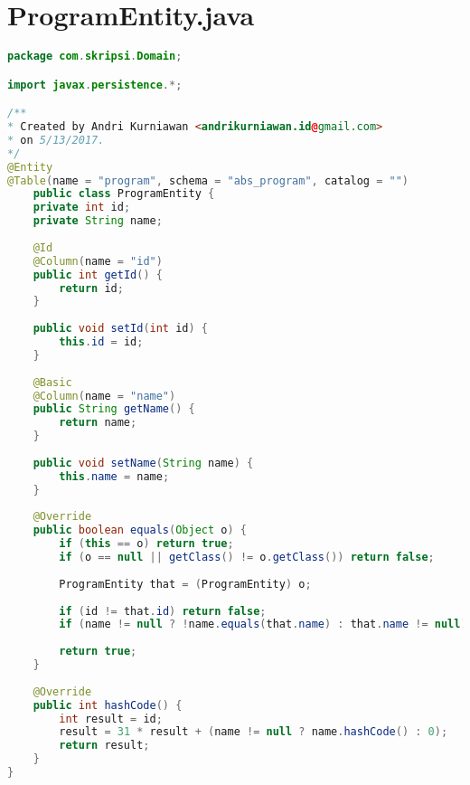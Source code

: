 \section*{ProgramEntity.java}
\begin{lstlisting}[caption={Berkas ProgramEntity.java},label={lst:ProgramEntity},language=Java]
package com.skripsi.Domain;

import javax.persistence.*;

/**
* Created by Andri Kurniawan <andrikurniawan.id@gmail.com>
* on 5/13/2017.
*/
@Entity
@Table(name = "program", schema = "abs_program", catalog = "")
	public class ProgramEntity {
	private int id;
	private String name;
	
	@Id
	@Column(name = "id")
	public int getId() {
		return id;
	}
	
	public void setId(int id) {
		this.id = id;
	}
	
	@Basic
	@Column(name = "name")
	public String getName() {
		return name;
	}
	
	public void setName(String name) {
		this.name = name;
	}
	
	@Override
	public boolean equals(Object o) {
		if (this == o) return true;
		if (o == null || getClass() != o.getClass()) return false;
		
		ProgramEntity that = (ProgramEntity) o;
		
		if (id != that.id) return false;
		if (name != null ? !name.equals(that.name) : that.name != null) return false;
		
		return true;
	}
	
	@Override
	public int hashCode() {
		int result = id;
		result = 31 * result + (name != null ? name.hashCode() : 0);
		return result;
	}
}

\end{lstlisting}

\newpage
